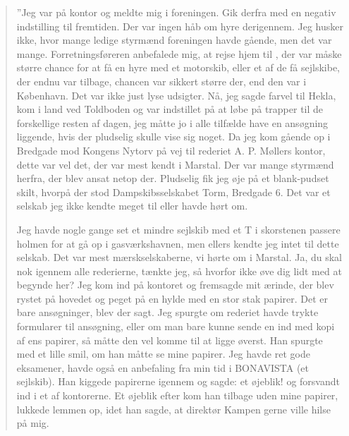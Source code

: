 \begin{quote}
    ''Jeg var på  kontor og meldte mig i foreningen.
    Gik derfra med en negativ indstilling til fremtiden. Der var ingen
    håb om hyre derigennem. Jeg husker ikke, hvor mange ledige styrmænd
    foreningen havde gående, men det var mange.  Forretningsføreren
    anbefalede mig, at rejse hjem til , der var måske
    større chance for at få en hyre med et motorskib, eller et af de få
    sejlskibe, der endnu var tilbage, chancen var sikkert større der, end
    den var i København. Det var ikke just lyse udsigter. Nå, jeg sagde
    farvel til Hekla, kom i land ved Toldboden og var indstillet på at
    løbe på trapper til de forskellige  resten af dagen,
    jeg måtte jo i alle tilfælde have en ansøgning liggende, hvis der
    pludselig skulle vise sig noget. Da jeg kom gående op i Bredgade mod
    Kongens Nytorv på vej til rederiet A. P. Møllers kontor, dette var
    vel det, der var mest kendt i Marstal. Der var mange styrmænd herfra,
    der blev ansat netop der.  Pludselig fik jeg øje på et blank-pudset
    skilt, hvorpå der stod Dampskibsselskabet Torm, Bredgade 6. Det var
    et selskab jeg ikke kendte meget til eller havde hørt om. 

    Jeg havde nogle gange set et mindre sejlskib med et T i skorstenen
    passere holmen for at gå op i gasværkshavnen, men ellers kendte jeg
    intet til dette selskab. Det var mest mærskselskaberne, vi hørte om i
    Marstal. Ja, du skal nok igennem alle rederierne, tænkte jeg, så
    hvorfor ikke øve dig lidt med at begynde her? Jeg kom ind på kontoret
    og fremsagde mit ærinde, der blev rystet på hovedet og peget på en
    hylde med en stor stak papirer. Det er bare ansøgninger, blev der
    sagt. Jeg spurgte om rederiet havde trykte formularer til ansøgning,
    eller om man bare kunne sende en ind med kopi af ens papirer, så
    måtte den vel komme til at ligge øverst. Han spurgte med et lille
    smil, om han måtte se mine papirer. Jeg havde ret gode eksamener,
    havde også en anbefaling fra min tid i BONAVISTA (et sejlskib). Han
    kiggede papirerne igennem og sagde: et øjeblik! og forsvandt ind i et
    af kontorerne. Et øjeblik efter kom han tilbage uden mine papirer,
    lukkede lemmen op, idet han sagde, at direktør Kampen gerne ville
    hilse på mig. 
    

\end{quote}
